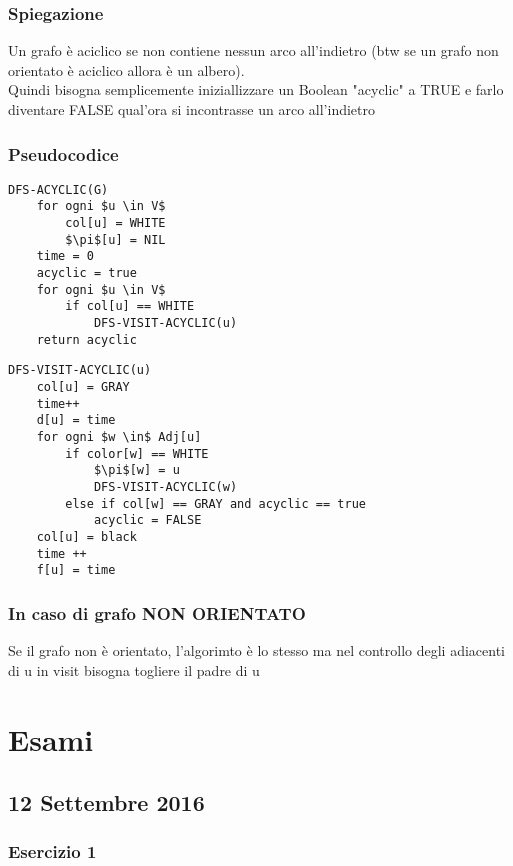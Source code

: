 \documentclass[12pt, a4paper, openany]{book}
\begin{document}
\subsection*{Spiegazione}
Un grafo è aciclico se non contiene nessun arco all'indietro (btw se un grafo non orientato è aciclico allora è un albero).
\\Quindi bisogna semplicemente iniziallizzare un Boolean "acyclic" a TRUE e farlo diventare FALSE qual'ora si incontrasse un arco all'indietro

\subsection*{Pseudocodice}
\begin{lstlisting}[mathescape=true]
DFS-ACYCLIC(G)
    for ogni $u \in V$
        col[u] = WHITE
        $\pi$[u] = NIL
    time = 0
    acyclic = true
    for ogni $u \in V$
        if col[u] == WHITE
            DFS-VISIT-ACYCLIC(u)
    return acyclic    
\end{lstlisting}

\begin{lstlisting}[mathescape=true]
DFS-VISIT-ACYCLIC(u)
    col[u] = GRAY
    time++
    d[u] = time
    for ogni $w \in$ Adj[u]
        if color[w] == WHITE
            $\pi$[w] = u
            DFS-VISIT-ACYCLIC(w)
        else if col[w] == GRAY and acyclic == true
            acyclic = FALSE
    col[u] = black
    time ++
    f[u] = time
\end{lstlisting}

\subsection*{In caso di grafo NON ORIENTATO}
Se il grafo non è orientato, l'algorimto è lo stesso ma nel controllo degli adiacenti di u in visit bisogna togliere il padre di u

\chapter{Esami}
\section{12 Settembre 2016}
\subsection{Esercizio 1}
\end{document}
